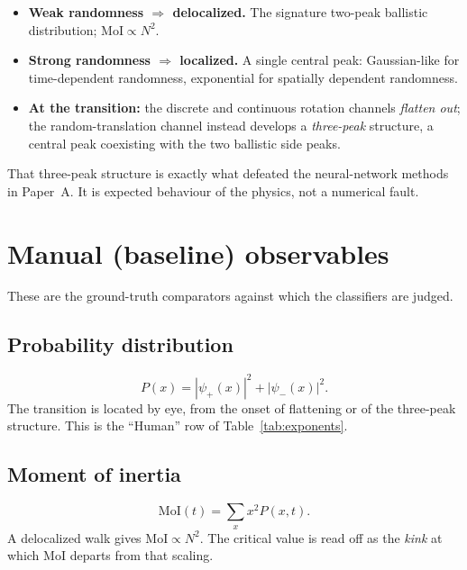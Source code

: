 \documentclass[11pt]{article}
\newcommand{\MoI}{\mathrm{MoI}}
\begin{document}
\begin{itemize}
  \item \textbf{Weak randomness $\Rightarrow$ delocalized.} The signature
        two-peak ballistic distribution; $\MoI \propto N^{2}$.
  \item \textbf{Strong randomness $\Rightarrow$ localized.} A single central
        peak: Gaussian-like for time-dependent randomness, exponential for
        spatially dependent randomness.
  \item \textbf{At the transition:} the discrete and continuous rotation
        channels \emph{flatten out}; the random-translation channel instead
        develops a \emph{three-peak} structure, a central peak coexisting
        with the two ballistic side peaks.
\end{itemize}

\noindent
That three-peak structure is exactly what defeated the neural-network methods
in Paper~A. It is expected behaviour of the physics, not a numerical fault.

\section{Manual (baseline) observables}
\label{sec:observables}

These are the ground-truth comparators against which the classifiers are
judged.

\subsection{Probability distribution}
\begin{equation}
P(x) = \left|\psi_{+}(x)\right|^{2} + \left|\psi_{-}(x)\right|^{2}.
\label{eq:prob}
\end{equation}
The transition is located by eye, from the onset of flattening or of the
three-peak structure. This is the ``Human'' row of Table~\ref{tab:exponents}.

\subsection{Moment of inertia}
\begin{equation}
\MoI(t) = \sum_{x} x^{2} P(x,t).
\label{eq:moi}
\end{equation}
A delocalized walk gives $\MoI \propto N^{2}$. The critical value is read off
as the \emph{kink} at which $\MoI$ departs from that scaling.
\end{document}
